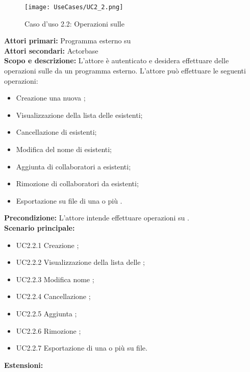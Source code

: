 \documentclass{scalatekids-article}
\begin{document}
\begin{figure}[H]
  \begin{center}
    \texttt{[image: UseCases/UC2\_2.png]}
    \caption*{Caso d'uso 2.2: Operazioni sulle }
  \end{center}
\end{figure}
\textbf{Attori primari:} Programma esterno su \\
\textbf{Attori secondari:} Actorbase\\
\textbf{Scopo e descrizione:} L'attore è autenticato e desidera effettuare delle operazioni sulle  da un programma  esterno. L'attore può effettuare le seguenti operazioni:
\begin{itemize}
\item Creazione una nuova ;
\item Visualizzazione della lista delle  esistenti;
\item Cancellazione di  esistenti;
\item Modifica del nome di  esistenti;
\item Aggiunta di collaboratori a  esistenti;
\item Rimozione di collaboratori da  esistenti;
\item Esportazione su file di una o più .
\end{itemize}
\textbf{Precondizione:} L'attore intende effettuare operazioni su .\\
\textbf{Scenario principale:}
\begin{itemize}
\item UC2.2.1 Creazione ;
\item UC2.2.2 Visualizzazione della lista delle ;
\item UC2.2.3 Modifica nome ;
\item UC2.2.4 Cancellazione ;
\item UC2.2.5 Aggiunta ;
\item UC2.2.6 Rimozione ;
\item UC2.2.7 Esportazione di una o più  su file.
\end{itemize}
\textbf{Estensioni:}
\end{document}
